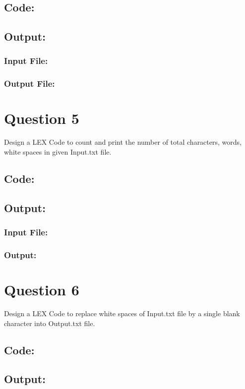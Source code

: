 \documentclass{article}
\begin{document}
\subsection*{Code:}

\newpage
\subsection*{Output:}
\subsubsection*{Input File:}

\subsubsection*{Output File:}


\newpage
\section*{Question 5}
Design a LEX Code to count and print the number of total 
characters, words, white spaces in given Input.txt file.
\subsection*{Code:}

\subsection*{Output:}
\subsubsection*{Input File:}

\subsubsection*{Output:}


\newpage
\section*{Question 6}
Design a LEX Code to replace white spaces of Input.txt
file by a single blank character into Output.txt file.
\subsection*{Code:}

\subsection*{Output:}
\end{document}
